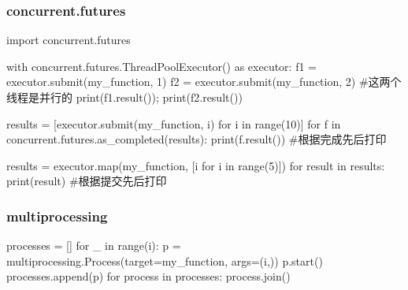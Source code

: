     \subsubsection{concurrent.futures}
      \begin{codeblock}[language=python, caption={concurrent.futures module}]
        import concurrent.futures
        
        with concurrent.futures.ThreadPoolExecutor() as executor:
            f1 = executor.submit(my_function, 1) 
            f2 = executor.submit(my_function, 2) #这两个线程是并行的
            print(f1.result()); print(f2.result())

            results = [executor.submit(my_function, i) for i in range(10)]
            for f in concurrent.futures.as_completed(results):
                print(f.result()) #根据完成先后打印

            results = executor.map(my_function, [i for i in range(5)])
            for result in results:
                print(result) #根据提交先后打印
      \end{codeblock}

    \subsubsection{multiprocessing}
      \begin{codeblock}[language=python, caption={multiprocessing module}]
        processes = []
        for _ in range(i):
            p = multiprocessing.Process(target=my_function, args=(i,))
            p.start()
            processes.append(p)
        for process in processes:
            process.join()
      \end{codeblock}

